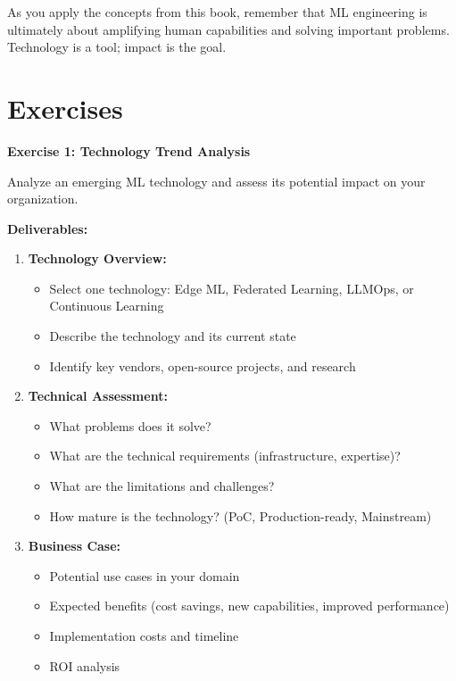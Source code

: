 As you apply the concepts from this book, remember that ML engineering is ultimately about amplifying human capabilities and solving important problems. Technology is a tool; impact is the goal.

\section{Exercises}

\begin{exercise}
\textbf{Exercise 1: Technology Trend Analysis}

Analyze an emerging ML technology and assess its potential impact on your organization.

\textbf{Deliverables:}
\begin{enumerate}
    \item \textbf{Technology Overview:}
    \begin{itemize}
        \item Select one technology: Edge ML, Federated Learning, LLMOps, or Continuous Learning
        \item Describe the technology and its current state
        \item Identify key vendors, open-source projects, and research
    \end{itemize}

    \item \textbf{Technical Assessment:}
    \begin{itemize}
        \item What problems does it solve?
        \item What are the technical requirements (infrastructure, expertise)?
        \item What are the limitations and challenges?
        \item How mature is the technology? (PoC, Production-ready, Mainstream)
    \end{itemize}

    \item \textbf{Business Case:}
    \begin{itemize}
        \item Potential use cases in your domain
        \item Expected benefits (cost savings, new capabilities, improved performance)
        \item Implementation costs and timeline
        \item ROI analysis
    \end{itemize}


\end{enumerate}
\end{exercise}
